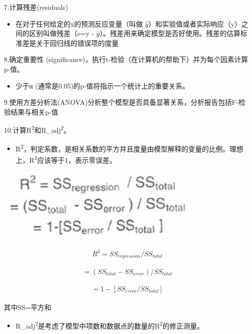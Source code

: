 7.计算残差(residuals)\\


\begin{itemize}
\tightlist
\item
  在对于任何给定的x的预测反应变量（叫做
  \(\hat y\)）和实验值或者实际响应（y）之间的区别叫做残差（e=y -
  \(\hat y\)）。残差用来确定模型是否好使用。残差的估算标准差是关于回归线的错误项的度量
\end{itemize}


8.确定重要性 (significance)，执行t-检验（在计算机的帮助下）并为每个因素计算p-值。\\


\begin{itemize}
\tightlist
\item
  少于α (通常是0.05)的p-值将指示一个统计上的重要关系。
\end{itemize}

9.使用方差分析法(ANOVA)分析整个模型是否具备显著关系，分析报告包括F-检验结果与相关p-值

10.计算R\textsuperscript{2}和R\_adj\textsuperscript{2}。


\begin{itemize}
\tightlist
\item
  R\textsuperscript{2}，判定系数，是相关系数的平方并且度量由模型解释的变量的比例。理想上，R\textsuperscript{2}应该等于1，表示零误差。
\end{itemize}


\includegraphics[width=10cm]{相关性10.png}

\[{R}^2 = {SS}_{regression} / {SS}_{total}\]\\
\[= ( {SS}_{total} - {SS}_{error} ) / {SS}_{total}\]\\
\[= 1 - [ {SS}_{error} / {SS}_{total} ]\]\\

其中SS=平方和

\begin{itemize}
\tightlist
\item
  R\_adj\textsuperscript{2}是考虑了模型中项数和数据点的数量的R\textsuperscript{2}的修正测量。
\end{itemize}

